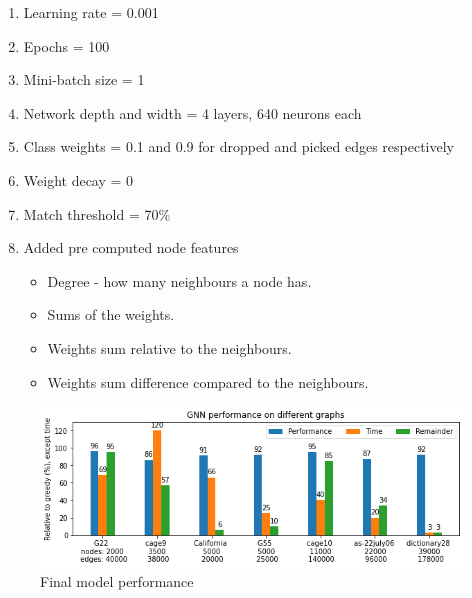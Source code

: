 \begin{enumerate}
\item Learning rate = 0.001
\item Epochs = 100
\item Mini-batch size = 1
\item Network depth and width = 4 layers, 640 neurons each
\item Class weights = 0.1 and 0.9 for dropped and picked edges respectively
\item Weight decay = 0
\item Match threshold = 70\%
\item Added pre computed node features
	\begin{itemize}
	\item Degree - how many neighbours a node has.
	\item Sums of the weights. 	
	\item Weights sum relative to the neighbours.
	\item Weights sum difference compared to the neighbours.
	\end{itemize}
\end{enumerate}

\begin{figure}[H]
    \centering
    \includegraphics[scale=0.8]{figures/FINALResults}
    \caption{Final model performance}
    \label{final model performance}
\end{figure}


